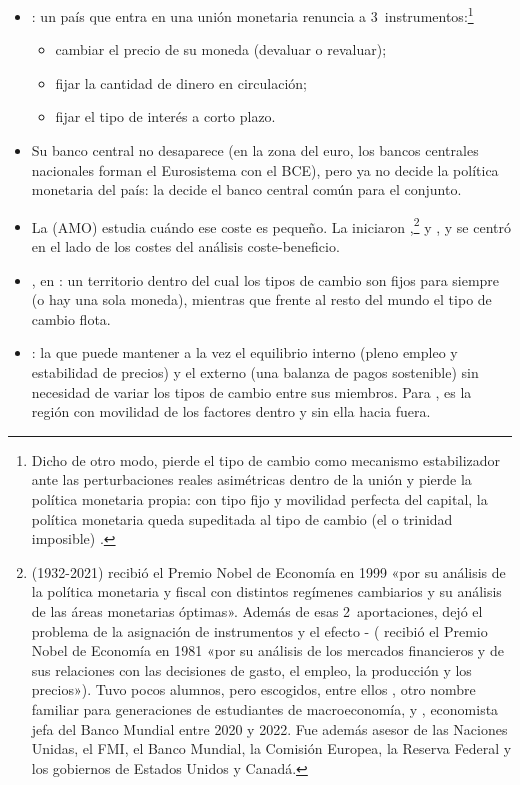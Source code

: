 \documentclass[11pt]{article}
\begin{document}
\begin{itemize}
\item {}: un país que entra en una unión monetaria renuncia a 3~instrumentos:\footnote{Dicho de otro modo, pierde el tipo de cambio como mecanismo estabilizador ante las perturbaciones reales asimétricas dentro de la unión y pierde la política monetaria propia: con tipo fijo y movilidad perfecta del capital, la política monetaria queda supeditada al tipo de cambio (el  o trinidad imposible) .}
  \begin{itemize}
  \item cambiar el precio de su moneda (devaluar o revaluar);
  \item fijar la cantidad de dinero en circulación;
  \item fijar el tipo de interés a corto plazo.
  \end{itemize}
\item Su banco central no desaparece (en la zona del euro, los bancos centrales nacionales forman el Eurosistema con el BCE), pero ya no decide la política monetaria del país: la decide el banco central común para el conjunto.
\item La  (AMO) estudia cuándo ese coste es pequeño. La iniciaron \textcite{Mundell1961Theory},\footnote{ (1932-2021) recibió el Premio Nobel de Economía en 1999 «por su análisis de la política monetaria y fiscal con distintos regímenes cambiarios y su análisis de las áreas monetarias óptimas»\nocite{Nobel1999Mundell,UChicago2021Mundell}. Además de esas 2~aportaciones, dejó el problema de la asignación de instrumentos  y el efecto - ( recibió el Premio Nobel de Economía en 1981 «por su análisis de los mercados financieros y de sus relaciones con las decisiones de gasto, el empleo, la producción y los precios»\nocite{Nobel1981Tobin}). Tuvo pocos alumnos, pero escogidos, entre ellos , otro nombre familiar para generaciones de estudiantes de macroeconomía, y , economista jefa del Banco Mundial entre 2020 y 2022. Fue además asesor de las Naciones Unidas, el FMI, el Banco Mundial, la Comisión Europea, la Reserva Federal y los gobiernos de Estados Unidos y Canadá.} \textcite{McKinnon1963Optimum} y \textcite{Kenen1969Theory}, y se centró en el lado de los costes del análisis coste-beneficio.
\item {}, en \textcite{Mundell1961Theory}: un territorio dentro del cual los tipos de cambio son fijos para siempre (o hay una sola moneda), mientras que frente al resto del mundo el tipo de cambio flota.
\item {}: la que puede mantener a la vez el equilibrio interno (pleno empleo y estabilidad de precios) y el externo (una balanza de pagos sostenible) sin necesidad de variar los tipos de cambio entre sus miembros. Para , es la región con movilidad de los factores dentro y sin ella hacia fuera.
\end{itemize}
\end{document}
